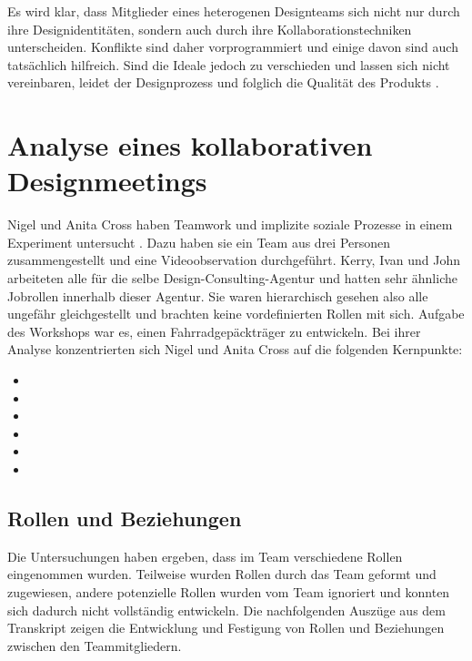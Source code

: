\medskip Es wird klar, dass Mitglieder eines heterogenen Designteams sich nicht nur durch ihre Designidentitäten, sondern auch durch ihre Kollaborationstechniken unterscheiden. Konflikte sind daher vorprogrammiert und einige davon sind auch tatsächlich hilfreich. Sind die Ideale jedoch zu verschieden und lassen sich nicht vereinbaren, leidet der Designprozess und folglich die Qualität des Produkts \citep{Kilker:1999}. 

\section{Analyse eines kollaborativen Designmeetings} 

Nigel und Anita Cross haben Teamwork und implizite soziale Prozesse in einem Experiment untersucht \citep{Cross:1995}. Dazu haben sie ein Team aus drei Personen zusammengestellt und eine Videoobservation durchgeführt. Kerry, Ivan und John arbeiteten alle für die selbe Design-Consulting-Agentur und hatten sehr ähnliche Jobrollen innerhalb dieser Agentur. Sie waren hierarchisch gesehen also alle ungefähr gleichgestellt und brachten keine vordefinierten Rollen mit sich. Aufgabe des Workshops war es, einen Fahrradgepäckträger zu entwickeln. Bei ihrer Analyse konzentrierten sich Nigel und Anita Cross auf die folgenden Kernpunkte:

\begin{itemize}
	\item {}
	\item {}
	\item {}
	\item {}
	\item {}
	\item {}
\end{itemize}

\subsection{Rollen und Beziehungen}\label{sec:collabRoles}

Die Untersuchungen haben ergeben, dass im Team verschiedene Rollen eingenommen wurden. Teilweise wurden Rollen durch das Team geformt und zugewiesen, andere potenzielle Rollen wurden vom Team ignoriert und konnten sich dadurch nicht vollständig entwickeln. Die nachfolgenden Auszüge aus dem Transkript zeigen die Entwicklung und Festigung von Rollen und Beziehungen zwischen den Teammitgliedern.


